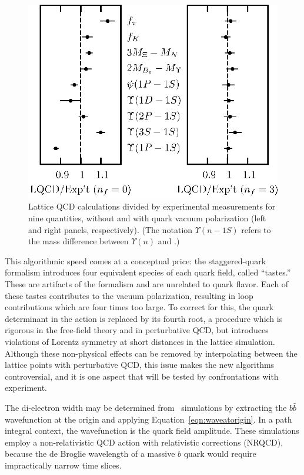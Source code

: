 \documentclass{cornell}
\begin{document}
\begin{figure}[p]
  \begin{center}
    \includegraphics[width=\linewidth]{latticevictory}
  \end{center}
  \caption[Lattice QCD results with and without vacuum
  polarization]{\label{latticevictory} Lattice QCD calculations
  divided by experimental measurements for nine quantities, without
  and with quark vacuum polarization (left and right panels,
  respectively).  (The notation $\Upsilon(n - 1S)$ refers to the mass
  difference between $\Upsilon(n)$ and \us.)}
\end{figure}

This algorithmic speed comes at a conceptual price: the
staggered-quark formalism introduces four equivalent species of each
quark field, called ``tastes.''  These are artifacts of the formalism
and are unrelated to quark flavor.  Each of these tastes contributes
to the vacuum polarization, resulting in loop contributions which are
four times too large.  To correct for this, the quark determinant in
the action is replaced by its fourth root, a procedure which is
rigorous in the free-field theory and in perturbative QCD, but
introduces violations of Lorentz symmetry at short distances in the
lattice simulation.  Although these non-physical effects can be
removed by interpolating between the lattice points with perturbative
QCD, this issue makes the new algorithms controversial, and it is one
aspect that will be tested by confrontations with experiment.

The di-electron width may be determined from \ups\ simulations by
extracting the $b\bar{b}$ wavefunction at the origin and applying
Equation~\ref{eqn:waveatorigin}.  In a path integral context, the
wavefunction is the quark field amplitude.  These simulations employ a
non-relativistic QCD action with relativistic corrections (NRQCD),
because the de Broglie wavelength of a massive $b$ quark would require
impractically narrow time slices.
\end{document}
